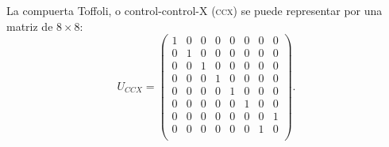 
La compuerta Toffoli, o control-control-X (\textsc{ccx}) se puede representar por una
matriz de $8 \times 8$:
\begin{equation}
  U_{CCX} =
  \begin{pmatrix}
    1 & 0 & 0 & 0 & 0 & 0 & 0 & 0\\
    0 & 1 & 0 & 0 & 0 & 0 & 0 & 0\\
    0 & 0 & 1 & 0 & 0 & 0 & 0 & 0\\
    0 & 0 & 0 & 1 & 0 & 0 & 0 & 0\\
    0 & 0 & 0 & 0 & 1 & 0 & 0 & 0\\
    0 & 0 & 0 & 0 & 0 & 1 & 0 & 0\\
    0 & 0 & 0 & 0 & 0 & 0 & 0 & 1\\
    0 & 0 & 0 & 0 & 0 & 0 & 1 & 0\\
  \end{pmatrix}.
\end{equation}




